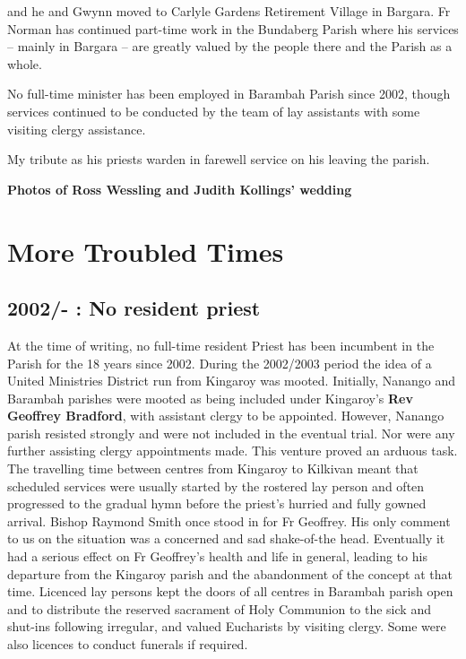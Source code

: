 and he and Gwynn moved to Carlyle Gardens Retirement Village in Bargara.
Fr Norman has continued part-time work in the Bundaberg Parish where his
services -- mainly in Bargara -- are greatly valued by the people there
and the Parish as a whole.

No full-time minister has been employed in Barambah Parish since 2002,
though services continued to be conducted by the team of lay assistants
with some visiting clergy assistance.

My tribute as his priests warden in farewell service on his leaving the
parish.

\textbf{Photos of Ross Wessling and Judith Kollings' wedding}

\hypertarget{more-troubled-times}{%
\chapter{More Troubled Times}\label{more-troubled-times}}

\hypertarget{no-resident-priest}{%
\section{2002/- : No resident priest}\label{no-resident-priest}}

At the time of writing, no full-time resident Priest has been incumbent
in the Parish for the 18 years since 2002. During the 2002/2003 period
the idea of a United Ministries District run from Kingaroy was mooted.
Initially, Nanango and Barambah parishes were mooted as being included
under Kingaroy's \textbf{Rev Geoffrey Bradford}, with assistant clergy
to be appointed. However, Nanango parish resisted strongly and were not
included in the eventual trial. Nor were any further assisting clergy
appointments made. This venture proved an arduous task. The travelling
time between centres from Kingaroy to Kilkivan meant that scheduled
services were usually started by the rostered lay person and often
progressed to the gradual hymn before the priest's hurried and fully
gowned arrival. Bishop Raymond Smith once stood in for Fr Geoffrey. His
only comment to us on the situation was a concerned and sad shake-of-the
head. Eventually it had a serious effect on Fr Geoffrey's health and
life in general, leading to his departure from the Kingaroy parish and
the abandonment of the concept at that time. Licenced lay persons kept
the doors of all centres in Barambah parish open and to distribute the
reserved sacrament of Holy Communion to the sick and shut-ins following
irregular, and valued Eucharists by visiting clergy. Some were also
licences to conduct funerals if required.

